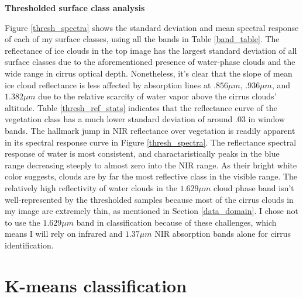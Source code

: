 \documentclass[12pt]{article}
\begin{document}
\noindent
\textbf{Thresholded surface class analysis}

Figure \ref{thresh_spectra} shows the standard deviation and mean spectral response of each of my surface classes, using all the bands in Table \ref{band_table}. The reflectance of ice clouds in the top image has the largest standard deviation of all surface classes due to the aforementioned presence of water-phase clouds and the wide range in cirrus optical depth. Nonetheless, it's clear that the slope of mean ice cloud reflectance is less affected by absorption lines at $.856\mu m$, $.936\mu m$, and $1.382\mu m$ due to the relative scarcity of water vapor above the cirrus clouds' altitude. Table \ref{thresh_ref_stats} indicates that the reflectance curve of the vegetation class has a much lower standard deviation of around $.03$ in window bands. The hallmark jump in NIR reflectance over vegetation is readily apparent in its spectral response curve in Figure \ref{thresh_spectra}. The reflectance spectral response of water is most consistent, and charactaristically peaks in the blue range decreasing steeply to almost zero into the NIR range. As their bright white color suggests, clouds are by far the most reflective class in the visible range. The relatively high reflectivity of water clouds in the $1.629\mu m$ cloud phase band isn't well-represented by the thresholded samples because most of the cirrus clouds in my image are extremely thin, as mentioned in Section \ref{data_domain}. I chose not to use the $1.629\mu m$ band in classification because of these challenges, which means I will rely on infrared and $1.37\mu m$ NIR absorption bands alone for cirrus identification.

\clearpage

\section{K-means classification}\label{section_km}
\end{document}
